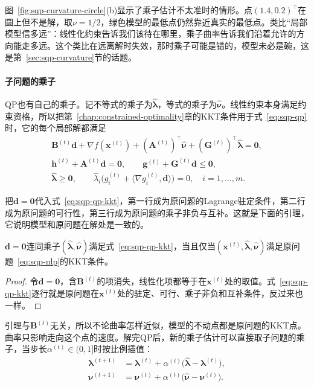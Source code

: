 图~\ref{fig:sqp-curvature-circle}(b)显示了乘子估计不太准时的情形。点$(1.4,0.2)^\top$在圆上但不是解，取$\nu=1/2$，绿色模型的最低点仍然靠近真实的最低点。类比“局部模型信多远”：线性化约束告诉我们该待在哪里，乘子曲率告诉我们沿着允许的方向能走多远。这个类比在远离解时失效，那时乘子可能是错的，模型未必是碗，这是第~\ref{sec:sqp-curvature}节的话题。

\paragraph{子问题的乘子}
QP也有自己的乘子。记不等式的乘子为$\hat{\bm{\lambda}}$，等式的乘子为$\hat{\bm{\nu}}$。线性约束本身满足约束资格，所以把第~\ref{chap:constrained-optimality}章的KKT条件用于式~\eqref{eq:sqp-qp}时，它的每个局部解都满足
\begin{equation}
 \begin{gathered}
 \bm{B}^{(t)}\bm{d}+\nabla f(\bm{x}^{(t)})+(\bm{A}^{(t)})^\top\hat{\bm{\nu}}+(\bm{G}^{(t)})^\top\hat{\bm{\lambda}}=\bm{0},\\
 \bm{h}^{(t)}+\bm{A}^{(t)}\bm{d}=\bm{0},\qquad \bm{g}^{(t)}+\bm{G}^{(t)}\bm{d}\leq\bm{0},\\
 \hat{\bm{\lambda}}\geq\bm{0},\qquad \hat\lambda_i\bigl(g_i^{(t)}+\langle\nabla g_i^{(t)},\bm{d}\rangle\bigr)=0,\quad i=1,\ldots,m.
 \end{gathered}
 \label{eq:sqp-qp-kkt}
\end{equation}

把$\bm{d}=\bm{0}$代入式~\eqref{eq:sqp-qp-kkt}，第一行成为原问题的Lagrange驻定条件，第二行成为原问题的可行性，第三行成为原问题的乘子非负与互补。这就是下面的引理，它说明模型和原问题在解处是一致的。

\begin{lemma}[零步与KKT点]
\label{lem:sqp-zero-step}
$\bm{d}=\bm{0}$连同乘子$(\hat{\bm{\lambda}},\hat{\bm{\nu}})$满足式~\eqref{eq:sqp-qp-kkt}，当且仅当$(\bm{x}^{(t)},\hat{\bm{\lambda}},\hat{\bm{\nu}})$满足原问题~\eqref{eq:sqp-nlp}的KKT条件。
\end{lemma}

\begin{proof}
令$\bm{d}=\bm{0}$，含$\bm{B}^{(t)}$的项消失，线性化项都等于在$\bm{x}^{(t)}$处的取值。式~\eqref{eq:sqp-qp-kkt}逐行就是原问题在$\bm{x}^{(t)}$处的驻定、可行、乘子非负和互补条件，反过来也一样。
\end{proof}

引理与$\bm{B}^{(t)}$无关，所以不论曲率怎样近似，模型的不动点都是原问题的KKT点。曲率只影响走向这个点的速度。解完QP后，新的乘子估计可以直接取子问题的乘子，当步长$\alpha^{(t)}\in(0,1]$时按比例插值：
\begin{equation}
 \begin{aligned}
 \bm{\lambda}^{(t+1)}&=\bm{\lambda}^{(t)}+\alpha^{(t)}\bigl(\hat{\bm{\lambda}}-\bm{\lambda}^{(t)}\bigr),\\
 \bm{\nu}^{(t+1)}&=\bm{\nu}^{(t)}+\alpha^{(t)}\bigl(\hat{\bm{\nu}}-\bm{\nu}^{(t)}\bigr).
 \end{aligned}
 \label{eq:sqp-multiplier-update}
\end{equation}

